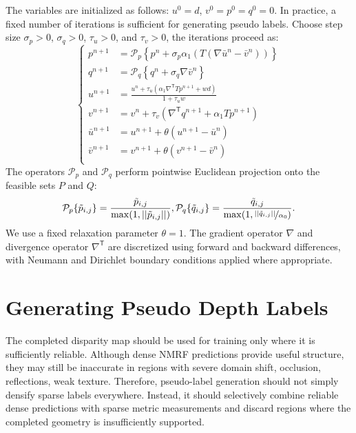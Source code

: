 The variables are initialized as follows: $u^0=d$, $v^0=p^0=q^0=0$.
In practice, a fixed number of iterations is sufficient for generating pseudo labels.
Choose step size $\sigma_p>0$, $\sigma_q>0$, $\tau_u>0$, and $\tau_v>0$, the iterations proceed as:
\begin{equation}
	\begin{cases}
		p^{n+1}&=\mathcal{P}_p\left\{p^n+\sigma_p\alpha_1\left(T(\nabla \bar{u}^n-\bar{v}^n)\right)\right\}\\
		q^{n+1}&=\mathcal{P}_q\left\{q^n+\sigma_q \nabla \bar{v}^n\right\}\\
		u^{n+1}&=\frac{u^n+\tau_u\left(\alpha_1\nabla^\mathsf{T} Tp^{n+1} + wd\right)}{1 + \tau_u w}\\
		v^{n+1}&=v^n+\tau_v\left( \nabla^\mathsf{T} q^{n+1} + \alpha_1Tp^{n+1}\right)\\
		\bar{u}^{n+1}&=u^{n+1}+\theta (u^{n+1}-\bar{u}^n)\\
		\bar{v}^{n+1}&=v^{n+1}+\theta (v^{n+1}-\bar{v}^n)\\
	\end{cases}
	\label{eq:pd-step}
\end{equation}
The operators $\mathcal{P}_p$ and $\mathcal{P}_q$ perform pointwise Euclidean projection onto the feasible sets $P$ and $Q$:
\begin{equation}
	\mathcal{P}_p\{\tilde{p}_{i,j}\}=\frac{\tilde{p}_{i,j}}{\max(1, ||\tilde{p}_{i,j}||)},
	\mathcal{P}_q\{\tilde{q}_{i,j}\}=\frac{\tilde{q}_{i,j}}{\max(1, \nicefrac{||\tilde{q}_{i,j}||}{\alpha_0})}.
\end{equation}
We use a fixed relaxation parameter $\theta=1$.
The gradient operator $\nabla$ and divergence operator $\nabla^\mathsf{T}$ are discretized using forward and backward differences, with Neumann and Dirichlet boundary conditions applied where appropriate.

\section{Generating Pseudo Depth Labels}

The completed disparity map should be used for training only where it is sufficiently reliable.
Although dense NMRF predictions provide useful structure, they may still be inaccurate in regions with severe domain shift, occlusion, reflections, weak texture.
Therefore, pseudo-label generation should not simply densify sparse labels everywhere.
Instead, it should selectively combine reliable dense predictions with sparse metric measurements and discard regions where the completed geometry is insufficiently supported.

